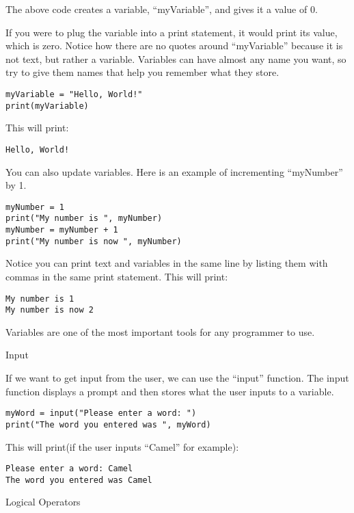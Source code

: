 \documentclass[12pt,oneside]{article}
\newcommand{\q}[1]{``#1''}
\newcommand{\subsectitle}[1]{
  \begin{flushleft}{\large#1}\end{flushleft}
}
\begin{document}
The above code creates a variable, \q{myVariable}, and gives it a value of 0. 

If you were to plug the variable into a print statement, it would print its value, which is zero. Notice how there are no quotes around \q{myVariable} because it is not text, but rather a variable. Variables can have almost any name you want, so try to give them names that help you remember what they store.

\begin{lstlisting}
myVariable = "Hello, World!"
print(myVariable)
\end{lstlisting}

This will print:

\begin{lstlisting}
Hello, World!
\end{lstlisting}

You can also update variables. Here is an example of incrementing \q{myNumber} by 1.

\begin{lstlisting}
myNumber = 1
print("My number is ", myNumber)
myNumber = myNumber + 1
print("My number is now ", myNumber)
\end{lstlisting}

Notice you can print text and variables in the same line by listing them with commas in the same print statement. This will print:

\begin{lstlisting}
My number is 1
My number is now 2
\end{lstlisting}

Variables are one of the most important tools for any programmer to use.

\subsectitle{Input}

If we want to get input from the user, we can use the \q{input} function. The input function displays a prompt and then stores what the user inputs to a variable.

\begin{lstlisting}
myWord = input("Please enter a word: ")
print("The word you entered was ", myWord)
\end{lstlisting}

This will print(if the user inputs \q{Camel} for example): 

\begin{lstlisting}
Please enter a word: Camel
The word you entered was Camel
\end{lstlisting}

\subsectitle{Logical Operators}
\end{document}
